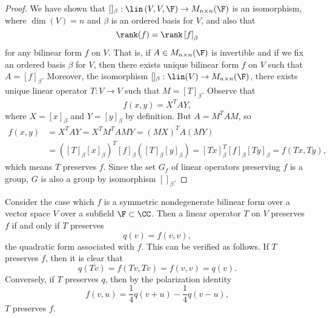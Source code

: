 \documentclass[linearalgebraII]{subfiles}
\begin{document}
    \begin{proof}
        We have shown that $[]_\beta:\lin\left( V,V,\F \right) \to M_{n\times n}(\F)$ is an isomorphism, where $\dim(V)=n$ and $\beta$ is an ordered basis for $V$, and also that
        \begin{equation*}
            \rank(f) = \rank\left[ f \right] _\beta
        \end{equation*}
        for any bilinear form $f$ on $V$. That is, if $A\in M_{n\times n}(\F)$ is invertible and if we fix an ordered basis $\beta$ for $V$, then there exists unique bilinear form $f$ on $V$ such that $A = \left[ f \right] _\beta$. Moreover, the isomorphism $[]_\beta: \lin(V)\to M_{n\times n}(\F)$, there exists unique linear operator $T:V\to V$ such that $M=\left[ T \right] _\beta$. Observe that
        \begin{equation*}
            f\left( x,y \right) = X^TAY,
        \end{equation*}
        where $X=\left[ x \right] _\beta$ and $Y=\left[ y \right] _\beta$ by definition. But $A=M^TAM$, so
        \begin{align*}
            f\left( x,y \right) & = X^TAY = X^TM^TAMY = \left( MX \right) ^TA\left( MY \right) \\ 
                                & = \left( \left[ T \right] _\beta\left[ x \right] _\beta \right) ^T \left[ f \right] _\beta\left( \left[ T \right] _\beta\left[ y \right] _\beta \right) = \left[ Tx \right] _\beta^T\left[ f \right] _\beta\left[ Ty \right] _\beta = f\left( Tx,Ty \right) ,
        \end{align*} 
        which means $T$ preserves $f$. Since the set $G_f$ of linear operators preserving $f$ is a group, $G$ is also a group by isomorphism $[]_\beta$. 
    \end{proof}

    \begin{remark}
        Consider the case which $f$ is a symmetric nondegenerate bilinear form over a vector space $V$ over a subfield $\F\subset\CC$. Then a linear operator $T$ on $V$ preserves $f$ if and only if $T$ preserves 
        \begin{equation*}
            q(v) = f(v,v),
        \end{equation*}
        the quadratic form associated with $f$. This can be verified as follows. If $T$ preserves $f$, then it is clear that
        \begin{equation*}
            q\left( Tv \right) = f\left( Tv,Tv \right) = f\left( v,v \right) = q\left( v \right) .
        \end{equation*}
        Conversely, if $T$ preserves $q$, then by the polarization identity
        \begin{equation*}
            f\left( v,u \right) = \frac{1}{4}q\left( v+u \right) - \frac{1}{4}q\left( v-u \right) , 
        \end{equation*}
        $T$ preserves $f$.
    \end{remark}
    
    
    

    
\end{document}
